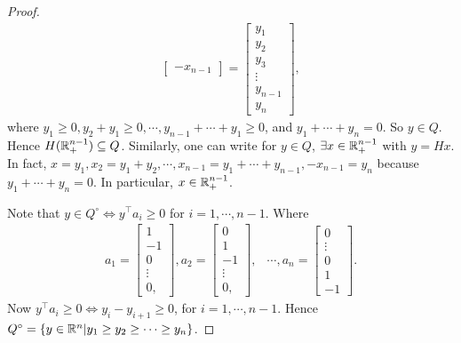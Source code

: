 \documentclass[12pt]{article}
\begin{document}
\begin{proof}
\begin{align}
\begin{bmatrix}
                 - x_{n - 1}
            \end{bmatrix}
            = \begin{bmatrix}
                y_1 \\ y_2 \\ y_3 \\ \vdots \\ y_{n - 1} \\ y_n
            \end{bmatrix},
        \end{align}
        where $y_1 \ge 0, y_2 + y_1 \ge 0, \cdots, y_{n - 1}+ \cdots + y_1 \ge 0$, and $y_1 + \cdots + y_n = 0$. So $y\in Q$. Hence $H(\mathbb R^{n - 1}_+)\subseteq Q$. Similarly, one can write for $y\in Q$, $\exists x \in \mathbb R_+^{n- 1}$ with $y = Hx$. In fact, $x = y_1, x_2 = y_1 + y_2, \cdots, x_{n - 1} = y_1 + \cdots + y_{n - 1}, -x_{n - 1} = y_n$ because $y_1 + \cdots + y_n = 0$. In particular, $x\in \mathbb R^{n - 1}_+$.
        \par
        Note that $y\in Q^\circ\iff y^{\intercal}a_i \ge 0$ for $i = 1,\cdots, n -1$. Where
        \begin{align}
            a_1 = \begin{bmatrix}
                1 \\ -1 \\ 0 \\ \vdots \\ 0,
            \end{bmatrix},
            a_2 = \begin{bmatrix}
                0 \\ 1 \\ -1 \\ \vdots \\ 0,
            \end{bmatrix},
            & \cdots,
            a_n =
            \begin{bmatrix}
                0 \\ \vdots \\ 0  \\ 1 \\ -1
            \end{bmatrix}.
        \end{align}
        Now $y^{\intercal} a_i \ge 0 \iff y_i - y_{i + 1}\ge 0$, for $i = 1,\cdots, n-1$. Hence $Q^\circ = \{ y\in \mathbb R^n | y_1 \ge y_2 \ge \cdots \ge y_n\}$.

    \end{proof}
\end{document}
